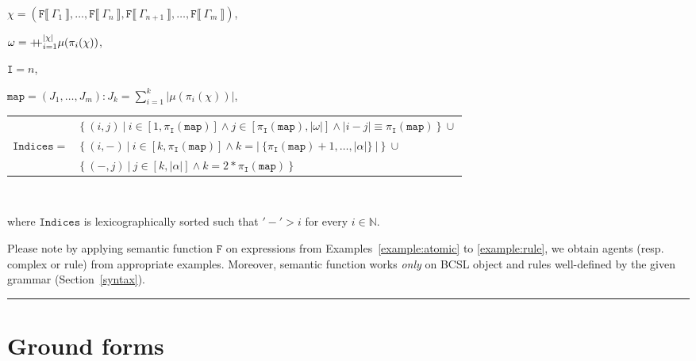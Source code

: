 \documentclass[12pt]{fithesis2}
\newcommand\mdoubleplus{\mathbin{+\mkern-7mu+}}
\begin{document}
\begin{center}
\begin{itemize}
\item $\chi = (\mathtt{F} \llbracket ~\Gamma_1~ \rrbracket, \ldots, \mathtt{F} \llbracket ~\Gamma_n~ \rrbracket, \mathtt{F} \llbracket ~\Gamma_{n+1}~ \rrbracket, \ldots, \mathtt{F} \llbracket ~\Gamma_m~ \rrbracket)$,
\item $\omega = \mdoubleplus_{i=1}^{|\chi|} \mu(\pi_i(\chi))$,
\item $\mathtt{I} = n$,
\item $\mathtt{map} = (J_1, \ldots, J_m): J_k = \sum\limits_{i=1}^{k} | \mu(\pi_i(\chi)) |$,
{\small
\item \begin{tabular}{l l}

& \hspace*{-0.3cm} $\{~ (i,j) ~|~ i \in [1, \pi_\mathtt{I}(\mathtt{map})] \wedge j \in [\pi_\mathtt{I}(\mathtt{map}), |\omega|] \wedge |i-j| \equiv \pi_\mathtt{I}(\mathtt{map})~\} ~\cup$ \\

\hspace*{-0.3cm}$\mathtt{Indices} =$ & \hspace*{-0.3cm} $\{~ (i, -) ~|~ i \in [k, \pi_\mathtt{I}(\mathtt{map})] \wedge k = |~ \{ \pi_\mathtt{I}(\mathtt{map}) + 1, \ldots, | \alpha | \} ~| ~\} ~\cup$\\

& \hspace*{-0.3cm} $ \{~ (-, j) ~|~ j \in [k, |\alpha|] \wedge k = 2 * \pi_\mathtt{I}(\mathtt{map}) ~\}$
\end{tabular}
\\}

\vspace*{0.5cm} where $\mathtt{Indices}$ is lexicographically sorted such that $'-' > i$ for every $i \in \mathbb{N}$.

\end{itemize}
\end{center}

Please note by applying semantic function $\mathtt{F}$ on expressions from Examples~\ref{example:atomic} to \ref{example:rule}, we obtain agents (resp. complex or rule) from appropriate examples. Moreover, semantic function works \emph{only} on BCSL object and rules well-defined by the given grammar (Section~\ref{syntax}).

\noindent\rule{\textwidth}{2pt}

\section{Ground forms}
\label{ground_forms}
\end{document}
